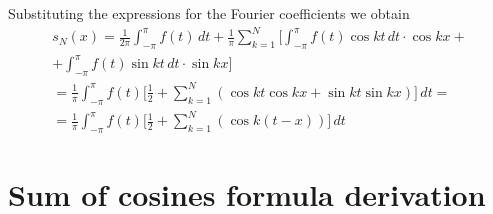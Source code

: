 \documentclass[12pt]{amsart}
\theoremstyle{definition}
\numberwithin{equation}{section}
\begin{document}
Substituting the expressions for the Fourier coefficients we obtain
\begin{eqnarray}
\label{eq:F_coefficients}
s_{N}(x)
=
\frac{1}{2\pi} \int_{-\pi}^{\pi} f(t) \, dt
+
\frac{1}{\pi} \sum_{k=1}^{N} \Big[\int_{-\pi}^{\pi} f(t) \cos kt \, dt \cdot \cos kx + \\ \nonumber
                               +   \int_{-\pi}^{\pi} f(t) \sin kt \, dt \cdot \sin kx 
\Big]                                                                                  \\ \nonumber
=
\frac{1}{\pi} \int_{-\pi}^{\pi} f(t) \Big[ \frac{1}{2} + \sum_{k=1}^{N} (\cos kt \cos kx + \sin kt \sin kx) \Big] \, dt = \\ \nonumber
=
\frac{1}{\pi} \int_{-\pi}^{\pi} f(t) \Big[ \frac{1}{2} + \sum_{k=1}^{N} (\cos k(t - x)) \Big] \, dt 
\end{eqnarray}




\section{Sum of cosines formula derivation}\label{sec2}
\end{document}

